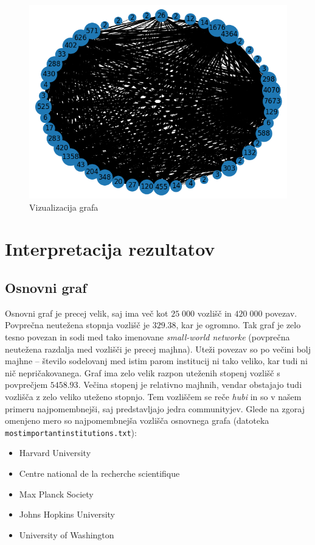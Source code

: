 \documentclass[a4paper,12pt]{article}
\begin{document}
	\begin{figure}[H]
		\centering
		\includegraphics[scale=0.7]{spectral_merged_graph_50_visualization}
		\caption{Vizualizacija grafa}
	\end{figure}
	
	\section{Interpretacija rezultatov}	
	\subsection{Osnovni graf}
	
	Osnovni graf je precej velik, saj ima več kot $25\; 000$ vozlišč in $420\; 000$ povezav. Povprečna neutežena stopnja vozlišč je $329.38$, kar je ogromno. Tak graf je zelo tesno povezan in sodi med tako imenovane \textit{small-world networke} (povprečna neutežena razdalja med vozlišči je precej majhna). Uteži povezav so po večini bolj majhne -- število sodelovanj med istim parom institucij ni tako veliko, kar tudi ni nič nepričakovanega. Graf ima zelo velik razpon uteženih stopenj vozlišč s povprečjem $5458.93$. Večina stopenj je relativno majhnih, vendar obstajajo tudi vozlišča z zelo veliko uteženo stopnjo. Tem vozliščem se reče \textit{hubi} in so v našem primeru najpomembnejši, saj predstavljajo jedra communityjev. Glede na zgoraj omenjeno mero so najpomembnejša vozlišča osnovnega grafa (datoteka \texttt{most\textunderscore important\textunderscore institutions.txt}):
	\begin{itemize}
		\item Harvard University
		\item Centre national de la recherche scientifique
		\item Max Planck Society
		\item Johns Hopkins University
		\item University of Washington		
	\end{itemize}
	
\end{document}
